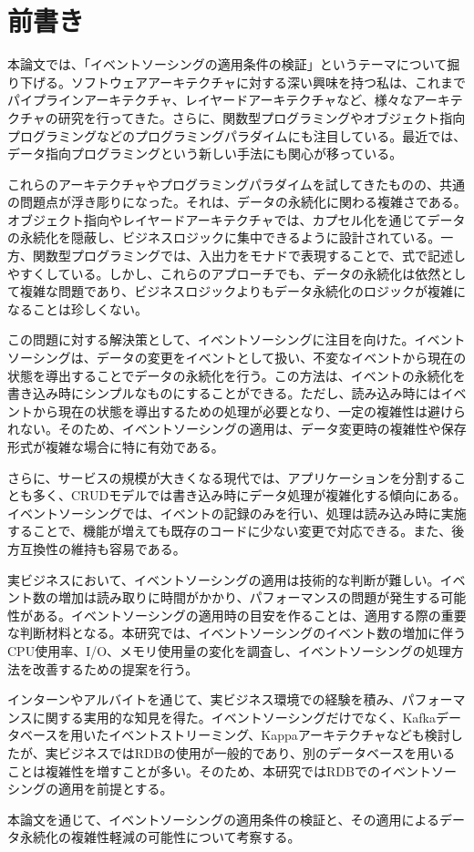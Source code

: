 \documentclass[../../main]{subfiles}
\begin{document}
    \chapter{前書き}\label{ch:preface}

    本論文では、「イベントソーシングの適用条件の検証」というテーマについて掘り下げる。ソフトウェアアーキテクチャに対する深い興味を持つ私は、これまでパイプラインアーキテクチャ、レイヤードアーキテクチャなど、様々なアーキテクチャの研究を行ってきた。さらに、関数型プログラミングやオブジェクト指向プログラミングなどのプログラミングパラダイムにも注目している。最近では、データ指向プログラミングという新しい手法にも関心が移っている。

    これらのアーキテクチャやプログラミングパラダイムを試してきたものの、共通の問題点が浮き彫りになった。それは、データの永続化に関わる複雑さである。オブジェクト指向やレイヤードアーキテクチャでは、カプセル化を通じてデータの永続化を隠蔽し、ビジネスロジックに集中できるように設計されている。一方、関数型プログラミングでは、入出力をモナドで表現することで、式で記述しやすくしている。しかし、これらのアプローチでも、データの永続化は依然として複雑な問題であり、ビジネスロジックよりもデータ永続化のロジックが複雑になることは珍しくない。

    この問題に対する解決策として、イベントソーシングに注目を向けた。イベントソーシングは、データの変更をイベントとして扱い、不変なイベントから現在の状態を導出することでデータの永続化を行う。この方法は、イベントの永続化を書き込み時にシンプルなものにすることができる。ただし、読み込み時にはイベントから現在の状態を導出するための処理が必要となり、一定の複雑性は避けられない。そのため、イベントソーシングの適用は、データ変更時の複雑性や保存形式が複雑な場合に特に有効である。

    さらに、サービスの規模が大きくなる現代では、アプリケーションを分割することも多く、CRUDモデルでは書き込み時にデータ処理が複雑化する傾向にある。イベントソーシングでは、イベントの記録のみを行い、処理は読み込み時に実施することで、機能が増えても既存のコードに少ない変更で対応できる。また、後方互換性の維持も容易である。

    実ビジネスにおいて、イベントソーシングの適用は技術的な判断が難しい。イベント数の増加は読み取りに時間がかかり、パフォーマンスの問題が発生する可能性がある。イベントソーシングの適用時の目安を作ることは、適用する際の重要な判断材料となる。本研究では、イベントソーシングのイベント数の増加に伴うCPU使用率、I/O、メモリ使用量の変化を調査し、イベントソーシングの処理方法を改善するための提案を行う。

    インターンやアルバイトを通じて、実ビジネス環境での経験を積み、パフォーマンスに関する実用的な知見を得た。イベントソーシングだけでなく、Kafkaデータベースを用いたイベントストリーミング、Kappaアーキテクチャなども検討したが、実ビジネスではRDBの使用が一般的であり、別のデータベースを用いることは複雑性を増すことが多い。そのため、本研究ではRDBでのイベントソーシングの適用を前提とする。

    本論文を通じて、イベントソーシングの適用条件の検証と、その適用によるデータ永続化の複雑性軽減の可能性について考察する。

    \clearpage
\end{document}
